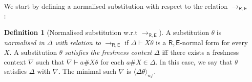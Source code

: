 \documentclass[submission,copyright,creativecommons]{eptcs}
\newcommand{\daniele}[1]{\textcolor{cyan}{#1}}
\newcommand{\alert}[1]{\textcolor{red}{#1}}
\newcommand{\dani}[1]{\textcolor{orange}{#1}}
\newcommand{\nfpair}[1]{\langle #1\rangle_{nf}}
\newcommand{\theory}[1]{\ensuremath{\mathsf{#1}}}
\theoremstyle{plain}
\theoremstyle{definition}
\newtheorem{definition}[theorem]{Definition}
\theoremstyle{remark}
\begin{document}
We start by defining a normalised substitution with respect to the relation $\to_{\theory{R,E}}$:
%

\begin{definition}[Normalised substitution w.r.t $\to_{\theory{R},\theory{E}}$]
A substitution $\theta$ is \emph{normalised in $\Delta$ with relation to $\to_{\theory{R,E}}$} if $\Delta \vdash X\theta$ is a $\theory{R,E}$-normal form  for every $X$. A substitution $\theta$ {\em satisfies the freshness context} $\Delta$ iff there exists a freshness context $\nabla$ such that $\nabla \vdash a\#X\theta$ for each $a\#X \in \Delta$. In this case, we say that $\theta$ satisfies $\Delta$ with $\nabla$. The minimal such $\nabla$ is $\nfpair{\Delta\theta}$.
\end{definition}


\end{document}
